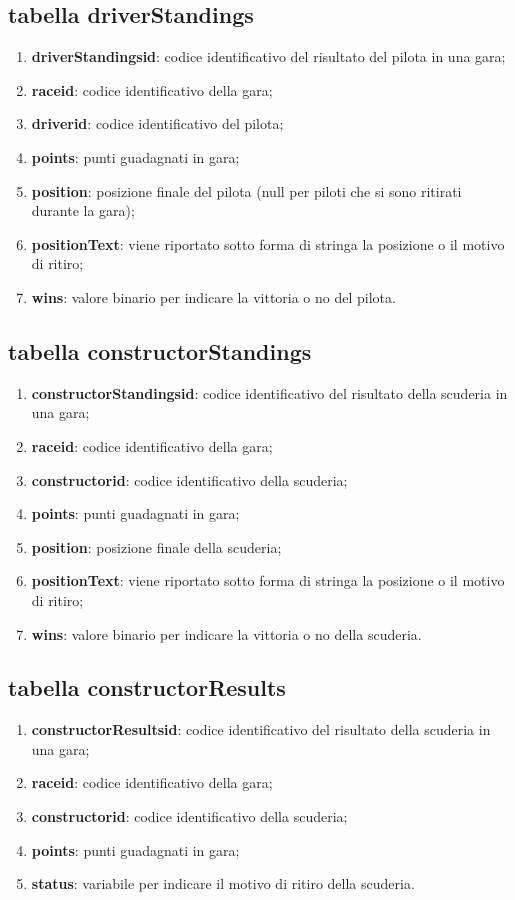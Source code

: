\subsection{tabella driverStandings}%
\begin{enumerate}
    \item \textbf{driverStandingsid}: codice identificativo del risultato del pilota in una gara;
    \item \textbf{raceid}: codice identificativo della gara;
    \item \textbf{driverid}: codice identificativo del pilota;
    \item \textbf{points}: punti guadagnati in gara;
   \item \textbf{position}: posizione finale del pilota (null per piloti che si sono ritirati durante la gara);
    \item \textbf{positionText}: viene riportato sotto forma di stringa la posizione o il motivo di ritiro;
    \item \textbf{wins}: valore binario per indicare la vittoria o no del pilota.
\end{enumerate}
\subsection{tabella constructorStandings}%
\begin{enumerate}
    \item \textbf{constructorStandingsid}: codice identificativo del risultato della scuderia in una gara;
    \item \textbf{raceid}: codice identificativo della gara;
    \item \textbf{constructorid}: codice identificativo della scuderia;
    \item \textbf{points}: punti guadagnati in gara;
   \item \textbf{position}: posizione finale della scuderia;
    \item \textbf{positionText}: viene riportato sotto forma di stringa la posizione o il motivo di ritiro;
    \item \textbf{wins}: valore binario per indicare la vittoria o no della scuderia.
\end{enumerate}
\subsection{tabella constructorResults}%
\begin{enumerate}
    \item \textbf{constructorResultsid}: codice identificativo del risultato della scuderia in una gara;
    \item \textbf{raceid}: codice identificativo della gara;
    \item \textbf{constructorid}: codice identificativo della scuderia;
    \item \textbf{points}: punti guadagnati in gara;
    \item \textbf{status}: variabile per indicare il motivo di ritiro della scuderia.
\end{enumerate}

